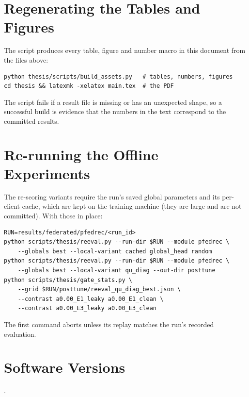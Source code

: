 \section{Regenerating the Tables and Figures}

The script  produces every table, figure and number
macro in this document from the files above:
\begin{verbatim}
python thesis/scripts/build_assets.py   # tables, numbers, figures
cd thesis && latexmk -xelatex main.tex  # the PDF
\end{verbatim}
The script fails if a result file is missing or has an unexpected shape, so a successful build
is evidence that the numbers in the text correspond to the committed results.

\section{Re-running the Offline Experiments}

The re-scoring variants require the run's saved global parameters and its per-client cache,
which are kept on the training machine (they are large and are not committed). With those in
place:
\begin{verbatim}
RUN=results/federated/pfedrec/<run_id>
python scripts/thesis/reeval.py --run-dir $RUN --module pfedrec \
    --globals best --local-variant cached global_head random
python scripts/thesis/reeval.py --run-dir $RUN --module pfedrec \
    --globals best --local-variant qu_diag --out-dir posttune
python scripts/thesis/gate_stats.py \
    --grid $RUN/posttune/reeval_qu_diag_best.json \
    --contrast a0.00_E1_leaky a0.00_E1_clean \
    --contrast a0.00_E3_leaky a0.00_E3_clean
\end{verbatim}
The first command aborts unless its  replay matches the run's recorded evaluation.

\section{Software Versions}

.
